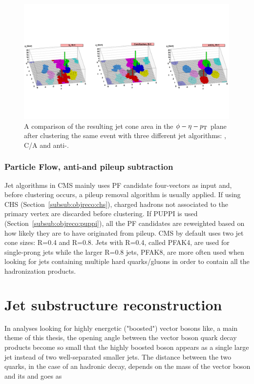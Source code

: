 \begin{figure}[ht] 
    \centering
    \includegraphics[width=0.99\textwidth]{figures/event_reconstruction/clustering_algos.pdf}
    \caption{A comparison of the resulting jet cone area in the $\phi-\eta-p_{\mathrm{T}}$ plane after clustering the same event with three different jet algorithms: \kt, C/A and anti-\kt. ~\cite{Cacciari:2008gp}}
    \label{fig:objreco:jetalgo_comp}
\end{figure}

\subsubsection{Particle Flow, anti-\kt and pileup subtraction }
Jet algorithms in CMS mainly uses PF candidate four-vectors as input and, before clustering occurs, a pileup removal algorithm is usually applied. If using CHS (Section~\ref{subsub:objreco:chs}), charged hadrons not associated to the primary vertex are discarded before clustering. If PUPPI is used (Section~\ref{subsub:objreco:puppi}), all the PF candidates are reweighted based on how likely they are to have originated from pileup. 
CMS by default uses two jet cone sizes: R=0.4 and R=0.8. Jets with R=0.4, called PFAK4, are used for single-prong jets while the larger R=0.8 jets, PFAK8, are more often used when looking for jets containing multiple hard quarks/gluons in order to contain all the hadronization products.

\section{Jet substructure reconstruction}
\label{sec:objreco:substructure}
In analyses looking for highly energetic ("boosted") vector bosons like, a main theme of this thesis, the opening angle between the vector boson quark decay products become so small that the highly boosted boson appears as a single large jet instead of two well-separated smaller jets. The distance between the two quarks, in the case of an hadronic decay, depends on the mass of the vector boson and its \PT and goes as

